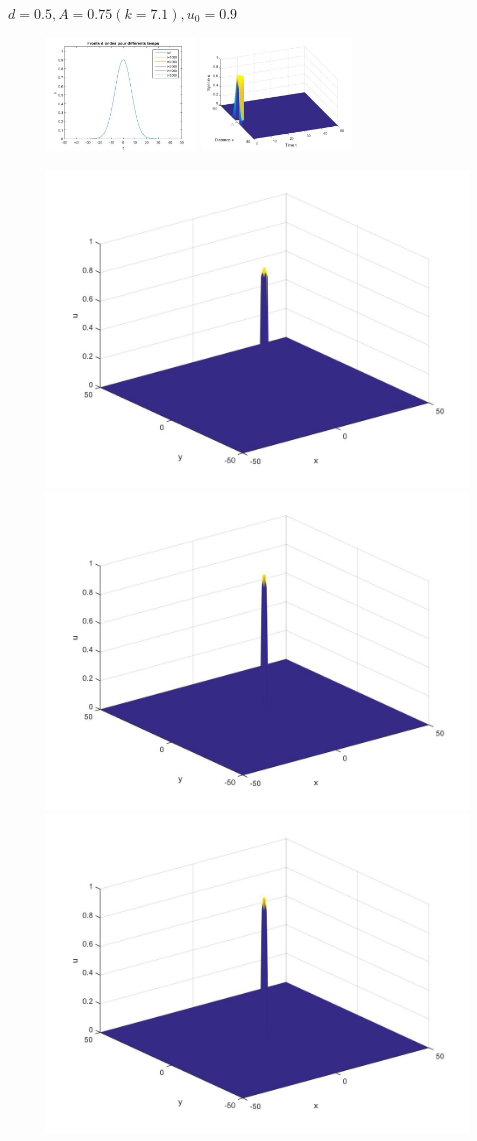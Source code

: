 \documentclass[10pt]{beamer}
\begin{document}
\begin{frame}{$\ d=0.5, A=0.75 (k=7.1), u_0=0.9$}{}
\begin{figure}[H]
	\centering
	\includegraphics[width=0.40\linewidth, height=3cm]{Allee/F2323}\hfill
	\includegraphics[width=0.55\linewidth, height=3cm]{Allee/F4323}
\end{figure}
\begin{figure}[H]
	\centering
	\includegraphics[width=0.3\linewidth]{Allee/323__1_}\hfill
    \includegraphics[width=0.3\linewidth]{Allee/323__2_}\hfill
	\includegraphics[width=0.3\linewidth]{Allee/323__3_}
\end{figure}
\end{frame}
\end{document}

